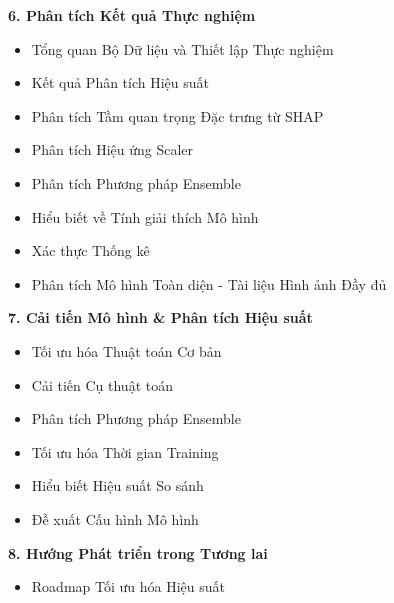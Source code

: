 \documentclass[a4paper,12pt]{article}
\begin{document}
\vspace{0.5em}
\noindent
\textbf{6. Phân tích Kết quả Thực nghiệm} \dotfill \pageref{sec:ra-detailed-results-analysis}
\begin{itemize}
    \item Tổng quan Bộ Dữ liệu và Thiết lập Thực nghiệm \dotfill \pageref{subsec:ra-experimental-overview}
    \item Kết quả Phân tích Hiệu suất \dotfill \pageref{subsec:ra-performance-by-model-groups}
    \item Phân tích Tầm quan trọng Đặc trưng từ SHAP \dotfill \pageref{subsec:ra-feature-importance-analysis}
    \item Phân tích Hiệu ứng Scaler \dotfill \pageref{subsec:detailed-scaler-analysis}
    \item Phân tích Phương pháp Ensemble \dotfill \pageref{subsec:detailed-ensemble-analysis}
    \item Hiểu biết về Tính giải thích Mô hình \dotfill \pageref{subsec:detailed-interpretability-insights}
    \item Xác thực Thống kê \dotfill \pageref{subsec:detailed-statistical-validation}
    \item Phân tích Mô hình Toàn diện - Tài liệu Hình ảnh Đầy đủ \dotfill \pageref{subsec:comprehensive-analysis}
\end{itemize}

\vspace{0.5em}
\noindent
\textbf{7. Cải tiến Mô hình \& Phân tích Hiệu suất} \dotfill \pageref{sec:model-improvements}
\begin{itemize}
    \item Tối ưu hóa Thuật toán Cơ bản \dotfill \pageref{subsec:basic-algorithm-optimization}
    \item Cải tiến Cụ thuật toán \dotfill \pageref{subsec:algorithm-specific}
    \item Phân tích Phương pháp Ensemble \dotfill \pageref{subsec:ensemble-methods}
    \item Tối ưu hóa Thời gian Training \dotfill \pageref{subsec:training-optimization}
    \item Hiểu biết Hiệu suất So sánh \dotfill \pageref{subsec:comparative-insights}
    \item Đề xuất Cấu hình Mô hình \dotfill \pageref{subsec:device-recommendations}
\end{itemize}

\vspace{0.5em}
\noindent
\textbf{8. Hướng Phát triển trong Tương lai} \dotfill \pageref{sec:future-development}
\begin{itemize}
    \item Roadmap Tối ưu hóa Hiệu suất \dotfill \pageref{subsec:performance-roadmap}
\end{itemize}
\end{document}
